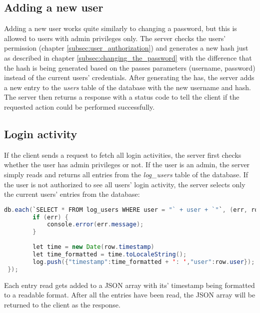 \subsection{Adding a new user}
\label{subsec:adding_a_new_user}

Adding a new user works quite similarly to changing a password, but this is allowed to users with admin privileges only. The server checks the users' permission (chapter \ref{subsec:user_authorization}) and generates a new hash just as described in chapter \ref{subsec:changing_the_password} with the difference that the hash is being generated based on the passes parameters (username, password) instead of the current users' credentials. After generating the has, the server adds a new entry to the \textit{users} table of the database with the new username and hash. The server then returns a response with a status code to tell the client if the requested action could be performed successfully.



\subsection{Login activity}
\label{subsec:login_activity}

If the client sends a request to fetch all login activities, the server first checks whether the user has admin privileges or not. If the user is an admin, the server simply reads and returns all entries from the \textit{log\_users} table of the database. If the user is not authorized to see all users' login activity, the server selects only the current users' entries from the database:

\begin{lstlisting}[language = Java, numbers = none]
 db.each(`SELECT * FROM log_users WHERE user = "` + user + `"`, (err, row) => {
 		if (err) {   
 			console.error(err.message);                                                              
 		}
                
 		let time = new Date(row.timestamp)
 		let time_formatted = time.toLocaleString();
 		log.push({"timestamp":time_formatted + ': ',"user":row.user});
 });
\end{lstlisting}

Each entry read gets added to a JSON array with its' timestamp being formatted to a readable format. After all the entries have been read, the JSON array will be returned to the client as the response.





